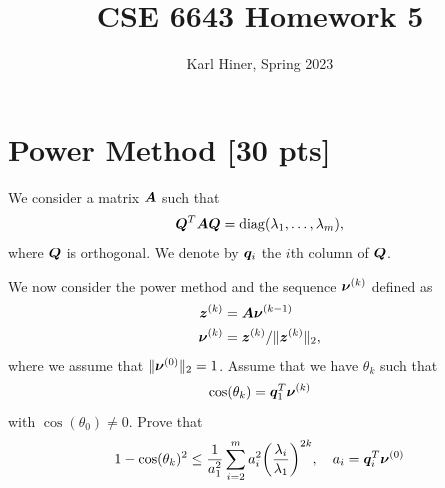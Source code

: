 \documentclass[twoside,10pt]{article}
\begin{document}
\title{CSE 6643 Homework 5}
\author{Karl Hiner, Spring 2023}
\date{}
\maketitle

\section{Power Method [30 pts]} 

We consider a matrix $\bm{A}$ such that
\begin{equation} 
  \mtx{Q}^T \mtx{A} \mtx{Q} = \operatorname{diag}\left(\lambda_1, \ldots, \lambda_m\right),
\end{equation}
where $\bm{Q}$ is orthogonal. We denote by $\bm{q}_i$ the $i$th column of $\bm{Q}$. 

We now consider the power method and the sequence $\bm{\nu}^{(k)}$  defined as 
\begin{align}
  \bm{z}^{(k)} &= \bm{A} \bm{\nu}^{(k - 1)} \\
  \bm{\nu}^{(k)} &= \bm{z}^{(k)} / \|\bm{z}^{(k)}\|_2,
\end{align}
where we assume that $\|\bm{\nu}^{(0)}\|_2 = 1$. Assume that we have $\theta_k$ such that 
\begin{equation}
  \cos(\theta_k) = \bm{q}_1^{T} \bm{\nu}^{(k)}
\end{equation}
with $\cos(\theta_{0}) \neq 0$.
Prove that 
\begin{equation}
  1 - \cos(\theta_k)^2 \leq \frac{1}{a_1^2} \sum \limits_{i = 2}^m a_i^2\left(\frac{\lambda_{i}}{\lambda_1}\right)^{2k}, \quad a_i = \vct{q}_i^T \vct{\nu}^{(0)} 
\end{equation}
\end{document}

